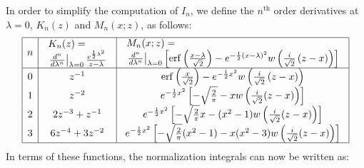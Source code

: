\documentclass[a4paper,10pt,twosided]{article}
\begin{document}
In order to simplify the  computation of  $I_n$, we define the $n^\mathrm{th}$ order derivatives at $\lambda=0$, $K_n(z)$ and $M_n(x;z)$, as follows:
\begin{equation}
\begin{array}{|c|c|c|}
\hline
n   
& \begin{array}{l}  K_n(z)   = \\  \left. \frac{d^n}{d\lambda^n}\right|_{\lambda=0} \frac{e^{\frac{1}{2}\lambda^2}}{z-\lambda}  \end{array}
& \begin{array}{l}  M_n(x;z) = \\  \left. \frac{d^n}{d\lambda^n}\right|_{\lambda=0} \left[ \mathrm{erf}\left(\frac{x-\lambda}{\sqrt{2}}\right)-  e^{-\frac{1}{2}\left(x-\lambda\right)^2}w\left(\frac{i}{\sqrt{2}}\left(z-x\right)\right)  \right] \end{array}
\\ \hline 
   0   & z^{-1} &  \mathrm{erf}\left(\frac{x}{\sqrt{2}}\right)-e^{-\frac{1}{2}x^2}w\left( \frac{i}{\sqrt{2}} \left(z-x\right)\right) 
\\ 1   & z^{-2}          & e^{-\frac{1}{2}x^2} \left[ - \sqrt{\frac{2}{\pi}}   -       x w\left(\frac{i}{\sqrt{2}}(z-x)  \right) \right]
\\ 2   & 2z^{-3}+z^{-1}  & e^{-\frac{1}{2}x^2} \left[ - \sqrt{\frac{2}{\pi}} x - (x^2-1) w\left(\frac{i}{\sqrt{2}}(z-x)\right) \right]
\\ 3   & 6z^{-4}+3z^{-2} & e^{-\frac{1}{2}x^2} \left[ - \sqrt{\frac{2}{\pi}} (x^2-1)-x(x^2-3)w\left(\frac{i}{\sqrt{2}}(z-x)\right)   \right]
\\ \hline
\end{array}
\end{equation}
In terms of these functions, the normalization integrals can now be written as:
\end{document}
